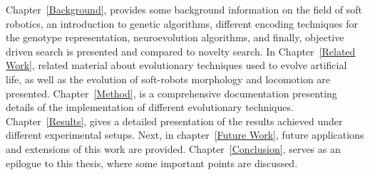 Chapter~\ref{Background}, provides some background information on the field of soft robotics, an introduction to genetic algorithms, different encoding techniques for the genotype representation, neuroevolution algorithms, and finally, objective driven search is presented and compared to novelty search. In Chapter~\ref{Related Work}, related material about evolutionary techniques used to evolve artificial life, as well as the evolution of soft-robots morphology and locomotion are presented. Chapter~\ref{Method}, is a comprehensive documentation presenting details of the implementation of different evolutionary techniques. Chapter~\ref{Results}, gives a detailed presentation of the results achieved under different experimental setups. Next, in chapter~\ref{Future Work}, future applications and extensions of this work are provided. Chapter~\ref{Conclusion}, serves as an epilogue to this thesis, where some important points are discussed.






